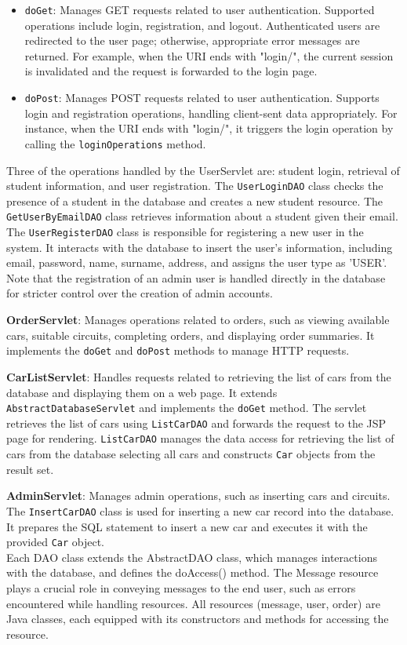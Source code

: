 \begin{itemize}
    \item \texttt{doGet}: Manages GET requests related to user authentication. Supported operations include login, registration, and logout. Authenticated users are redirected to the user page; otherwise, appropriate error messages are returned. For example, when the URI ends with "login/", the current session is invalidated and the request is forwarded to the login page.
    \item \texttt{doPost}: Manages POST requests related to user authentication. Supports login and registration operations, handling client-sent data appropriately. For instance, when the URI ends with "login/", it triggers the login operation by calling the \texttt{loginOperations} method.
\end{itemize}

Three of the operations handled by the UserServlet are: student login, retrieval of student information, and user registration. The \texttt{UserLoginDAO} class checks the presence of a student in the database and creates a new student resource. The \texttt{GetUserByEmailDAO} class retrieves information about a student given their email. The \texttt{UserRegisterDAO} class is responsible for registering a new user in the system. It interacts with the database to insert the user's information, including email, password, name, surname, address, and assigns the user type as 'USER'. Note that the registration of an admin user is handled directly in the database for stricter control over the creation of admin accounts.

\textbf{OrderServlet}: Manages operations related to orders, such as viewing available cars, suitable circuits, completing orders, and displaying order summaries. It implements the \texttt{doGet} and \texttt{doPost} methods to manage HTTP requests.

\textbf{CarListServlet}: Handles requests related to retrieving the list of cars from the database and displaying them on a web page. It extends \texttt{AbstractDatabaseServlet} and implements the \texttt{doGet} method. The servlet retrieves the list of cars using \texttt{ListCarDAO} and forwards the request to the JSP page for rendering. \texttt{ListCarDAO} manages the data access for retrieving the list of cars from the database selecting all cars and constructs \texttt{Car} objects from the result set.

\textbf{AdminServlet}: Manages admin operations, such as inserting cars and circuits. The \texttt{InsertCarDAO} class is used for inserting a new car record into the database. It prepares the SQL statement to insert a new car and executes it with the provided \texttt{Car} object.\\

Each DAO class extends the AbstractDAO class, which manages interactions with the database, and defines the doAccess() method. The Message resource plays a crucial role in conveying messages to the end user, such as errors encountered while handling resources. All resources (message, user, order) are Java classes, each equipped with its constructors and methods for accessing the resource.